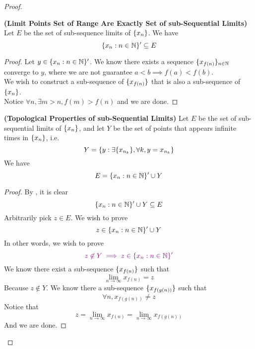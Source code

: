 \documentclass{report}
\begin{document}
\begin{proof}
{\begin{minipage}{39em}
\end{minipage}}
\begin{theorem}
\label{2.3.6}
\textbf{(Limit Points Set of Range Are Exactly Set of sub-Sequential Limits)} Let $E$ be the set of sub-sequence limits of  $\{ x_n \}$. We have
\begin{equation}
\{ x_n:n\in\mathbb{N} \}'\subseteq E
\end{equation}
\end{theorem}
\begin{proof}
Let $y\in \{ x_n:n\in\mathbb{N} \}'$. We know there exists a sequence $\{ x_{f(n)} \}_{n\in\mathbb{N}}$ converge to $y$, where we are not guarantee $a<b\implies f(a)<f(b)$.\\

We wish to construct a sub-sequence of $\{ x_{f(n)} \}$ that is also a sub-sequence of $\{ x_n \}$.\\

Notice  $\forall n, \exists m>n, f(m)>f(n)$ and we are done.
\end{proof}
\begin{theorem}
\label{2.3.7}
\textbf{(Topological Properties of sub-Sequential Limits)} Let $E$ be the set of sub-sequential limits of $\{ x_n \}$, and let $Y$ be the set of points that appears infinite times in  $\{ x_n \}$, i.e.
\begin{equation}
  Y=\{ y:\exists \{ x_{n_k} \},\forall k, y=x_{n_k} \}
\end{equation}
We have
\begin{equation}
E=\{ x_n:n\in\mathbb{N} \}' \cup Y
\end{equation}
\end{theorem}
\begin{proof}
By , it is clear 
\begin{equation}
\{ x_n:n\in\mathbb{N} \}' \cup Y\subseteq E
\end{equation}
Arbitrarily pick $z\in E$. We wish to prove
\begin{equation}
z\in \{ x_n:n\in\mathbb{N} \}'\cup Y
\end{equation}
In other words, we wish to prove
\begin{equation}
  \textcolor{violet}{z\not\in Y\implies z\in \{ x_n:n\in\mathbb{N} \}'}
\end{equation}
We know there exist a sub-sequence $\{ x_{f(n)} \}$ such that 
\begin{equation}
\lim_{n\to\infty}x_{f(n)}=z
\end{equation}
Because $z\not\in Y$. We know there a sub-sequence $\{ x_{f(g(n))} \}$ such that
\begin{equation}
\forall n,x_{f(g(n))}\neq z
\end{equation}
Notice that
 \begin{equation}
z=\lim_{n\to\infty}x_{f(n)}=\lim_{n\to\infty}x_{f(g(n))} 
\end{equation}
And we are done.
\end{proof}
\fbox{\begin{minipage}{39em}


\end{minipage}}
\end{proof}
\end{document}
